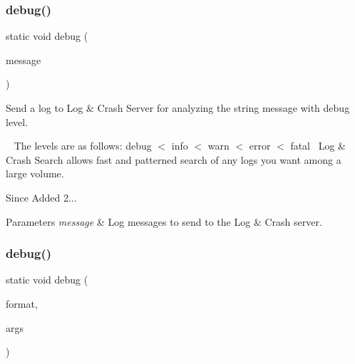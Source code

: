 \subsubsection{\texorpdfstring{debug()}{debug()}\hspace{0.1cm}{\footnotesize\ttfamily [1/3]}}
{\footnotesize\ttfamily static void debug (\begin{DoxyParamCaption}\item[{@Non\+Null final String}]{message }\end{DoxyParamCaption})\hspace{0.3cm}{\ttfamily [static]}}



Send a log to Log \& Crash Server for analyzing the string message with debug level. 

~\newline
 The levels are as follows\+: debug $<$ info $<$ warn $<$ error $<$ fatal~\newline
 Log \& Crash Search allows fast and patterned search of any logs you want among a large volume.

\begin{DoxySince}{Since}
Added 2... 
\end{DoxySince}

\begin{DoxyParams}{Parameters}
{\em message} & Log messages to send to the Log \& Crash server. \\
\hline
\end{DoxyParams}
\mbox{\label{classcom_1_1toast_1_1android_1_1gamebase_1_1_gamebase_1_1_logger_a976460e1331501a44c47449a487140fb}} 
\subsubsection{\texorpdfstring{debug()}{debug()}\hspace{0.1cm}{\footnotesize\ttfamily [2/3]}}
{\footnotesize\ttfamily static void debug (\begin{DoxyParamCaption}\item[{@Non\+Null final String}]{format,  }\item[{@Non\+Null final Object...}]{args }\end{DoxyParamCaption})\hspace{0.3cm}{\ttfamily [static]}}



